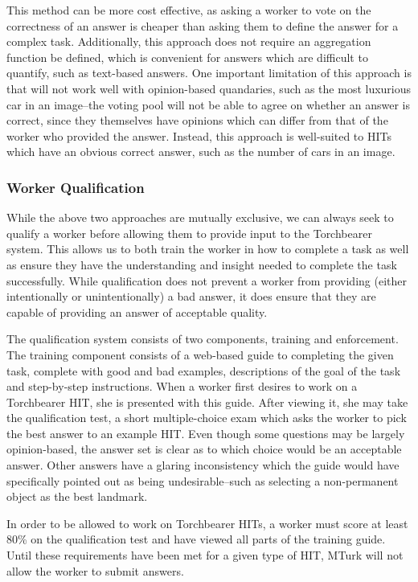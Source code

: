 This method can be more cost effective, as asking a worker to vote on the correctness of an answer is cheaper than asking them to define the answer for a complex task. Additionally, this approach does not require an aggregation function be defined, which is convenient for answers which are difficult to quantify, such as text-based answers. One important limitation of this approach is that will not work well with opinion-based quandaries, such as the most luxurious car in an image--the voting pool will not be able to agree on whether an answer is correct, since they themselves have opinions which can differ from that of the worker who provided the answer. Instead, this approach is well-suited to HITs which have an obvious correct answer, such as the number of cars in an image.

\subsubsection{Worker Qualification}

While the above two approaches are mutually exclusive, we can always seek to qualify a worker before allowing them to provide input to the Torchbearer system. This allows us to both train the worker in how to complete a task as well as ensure they have the understanding and insight needed to complete the task successfully. While qualification does not prevent a worker from providing (either intentionally or unintentionally) a bad answer, it does ensure that they are capable of providing an answer of acceptable quality.

The qualification system consists of two components, training and enforcement. The training component consists of a web-based guide to completing the given task, complete with good and bad examples, descriptions of the goal of the task and step-by-step instructions. When a worker first desires to work on a Torchbearer HIT, she is presented with this guide. After viewing it, she may take the qualification test, a short multiple-choice exam which asks the worker to pick the best answer to an example HIT. Even though some questions may be largely opinion-based, the answer set is clear as to which choice would be an acceptable answer. Other answers have a glaring inconsistency which the guide would have specifically pointed out as being undesirable--such as selecting a non-permanent object as the best landmark.

In order to be allowed to work on Torchbearer HITs, a worker must score at least 80\% on the qualification test and have viewed all parts of the training guide. Until these requirements have been met for a given type of HIT, MTurk will not allow the worker to submit answers.


